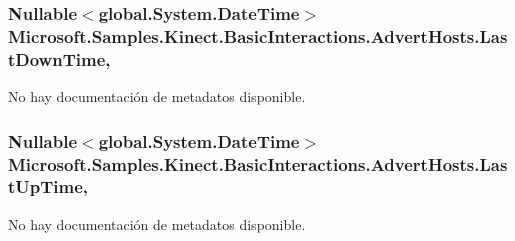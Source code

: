 \hypertarget{class_microsoft_1_1_samples_1_1_kinect_1_1_basic_interactions_1_1_advert_hosts_af374fb4ee99d5cfe8a5d6012a50fe2af}{
\subsubsection[{Last\-Down\-Time}]{\setlength{\rightskip}{0pt plus 5cm}Nullable$<$global.\-System.\-Date\-Time$>$ Microsoft.\-Samples.\-Kinect.\-Basic\-Interactions.\-Advert\-Hosts.\-Last\-Down\-Time\hspace{0.3cm}{\ttfamily [get]}, {\ttfamily [set]}}}\label{class_microsoft_1_1_samples_1_1_kinect_1_1_basic_interactions_1_1_advert_hosts_af374fb4ee99d5cfe8a5d6012a50fe2af}


No hay documentación de metadatos disponible. 

\hypertarget{class_microsoft_1_1_samples_1_1_kinect_1_1_basic_interactions_1_1_advert_hosts_afe8d092bd9e77dc94001027e907f42b5}{
\subsubsection[{Last\-Up\-Time}]{\setlength{\rightskip}{0pt plus 5cm}Nullable$<$global.\-System.\-Date\-Time$>$ Microsoft.\-Samples.\-Kinect.\-Basic\-Interactions.\-Advert\-Hosts.\-Last\-Up\-Time\hspace{0.3cm}{\ttfamily [get]}, {\ttfamily [set]}}}\label{class_microsoft_1_1_samples_1_1_kinect_1_1_basic_interactions_1_1_advert_hosts_afe8d092bd9e77dc94001027e907f42b5}


No hay documentación de metadatos disponible. 

